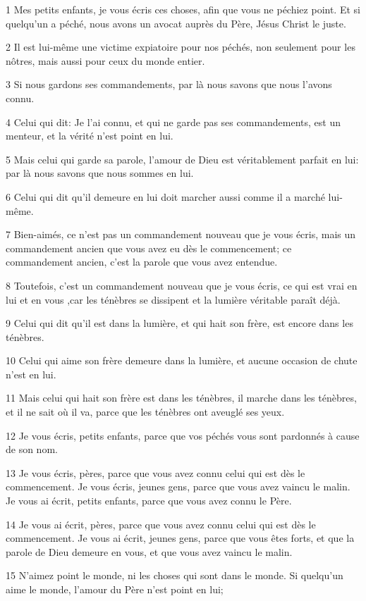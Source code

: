 \par 1 Mes petits enfants, je vous écris ces choses, afin que vous ne péchiez point. Et si quelqu'un a péché, nous avons un avocat auprès du Père, Jésus Christ le juste.
\par 2 Il est lui-même une victime expiatoire pour nos péchés, non seulement pour les nôtres, mais aussi pour ceux du monde entier.
\par 3 Si nous gardons ses commandements, par là nous savons que nous l'avons connu.
\par 4 Celui qui dit: Je l'ai connu, et qui ne garde pas ses commandements, est un menteur, et la vérité n'est point en lui.
\par 5 Mais celui qui garde sa parole, l'amour de Dieu est véritablement parfait en lui: par là nous savons que nous sommes en lui.
\par 6 Celui qui dit qu'il demeure en lui doit marcher aussi comme il a marché lui-même.
\par 7 Bien-aimés, ce n'est pas un commandement nouveau que je vous écris, mais un commandement ancien que vous avez eu dès le commencement; ce commandement ancien, c'est la parole que vous avez entendue.
\par 8 Toutefois, c'est un commandement nouveau que je vous écris, ce qui est vrai en lui et en vous ,car les ténèbres se dissipent et la lumière véritable paraît déjà.
\par 9 Celui qui dit qu'il est dans la lumière, et qui hait son frère, est encore dans les ténèbres.
\par 10 Celui qui aime son frère demeure dans la lumière, et aucune occasion de chute n'est en lui.
\par 11 Mais celui qui hait son frère est dans les ténèbres, il marche dans les ténèbres, et il ne sait où il va, parce que les ténèbres ont aveuglé ses yeux.
\par 12 Je vous écris, petits enfants, parce que vos péchés vous sont pardonnés à cause de son nom.
\par 13 Je vous écris, pères, parce que vous avez connu celui qui est dès le commencement. Je vous écris, jeunes gens, parce que vous avez vaincu le malin. Je vous ai écrit, petits enfants, parce que vous avez connu le Père.
\par 14 Je vous ai écrit, pères, parce que vous avez connu celui qui est dès le commencement. Je vous ai écrit, jeunes gens, parce que vous êtes forts, et que la parole de Dieu demeure en vous, et que vous avez vaincu le malin.
\par 15 N'aimez point le monde, ni les choses qui sont dans le monde. Si quelqu'un aime le monde, l'amour du Père n'est point en lui;
